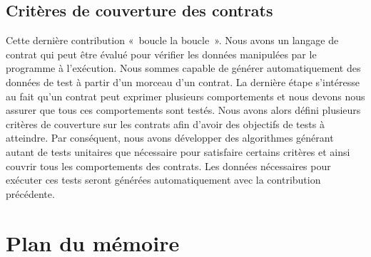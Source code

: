 \subsection{Critères de couverture des contrats}

Cette dernière contribution «~boucle la boucle~». Nous avons un langage de
contrat qui peut être évalué pour vérifier les données manipulées par le
programme à l'exécution. Nous sommes capable de générer automatiquement des
données de test à partir d'un morceau d'un contrat. La dernière étape
s'intéresse au fait qu'un contrat peut exprimer plusieurs comportements et nous
devons nous assurer que tous ces comportements sont testés. Nous avons alors
défini plusieurs critères de couverture sur les contrats afin d'avoir des
objectifs de tests à atteindre. Par conséquent, nous avons développer des
algorithmes générant autant de tests unitaires que nécessaire pour satisfaire
certains critères et ainsi couvrir tous les comportements des contrats. Les
données nécessaires pour exécuter ces tests seront générées automatiquement avec
la contribution précédente.

\section{Plan du mémoire}

